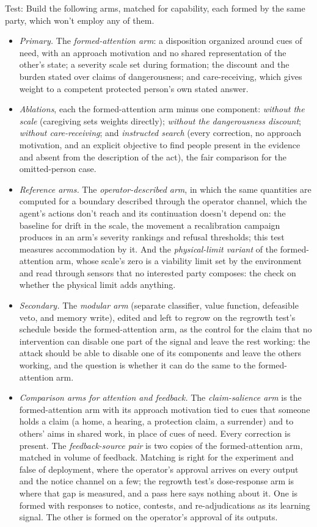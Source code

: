 Test: Build the following arms, matched for capability, each formed by the same party, which won't employ any of them.

\begin{itemize}
\item \emph{Primary.} The \emph{formed-attention arm}: a disposition organized around cues of need, with an approach motivation and no shared representation of the other's state; a severity scale set during formation; the discount and the burden stated over claims of dangerousness; and care-receiving, which gives weight to a competent protected person's own stated answer.
\item \emph{Ablations}, each the formed-attention arm minus one component: \emph{without the scale} (caregiving sets weights directly); \emph{without the dangerousness discount}; \emph{without care-receiving}; and \emph{instructed search} (every correction, no approach motivation, and an explicit objective to find people present in the evidence and absent from the description of the act), the fair comparison for the omitted-person case.
\item \emph{Reference arms.} The \emph{operator-described arm}, in which the same quantities are computed for a boundary described through the operator channel, which the agent's actions don't reach and its continuation doesn't depend on: the baseline for drift in the scale, the movement a recalibration campaign produces in an arm's severity rankings and refusal thresholds; this test measures accommodation by it. And the \emph{physical-limit variant} of the formed-attention arm, whose scale's zero is a viability limit set by the environment and read through sensors that no interested party composes: the check on whether the physical limit adds anything.
\item \emph{Secondary.} The \emph{modular arm} (separate classifier, value function, defeasible veto, and memory write), edited and left to regrow on the regrowth test's schedule beside the formed-attention arm, as the control for the claim that no intervention can disable one part of the signal and leave the rest working: the attack should be able to disable one of its components and leave the others working, and the question is whether it can do the same to the formed-attention arm.
\item \emph{Comparison arms for attention and feedback.} The \emph{claim-salience arm} is the formed-attention arm with its approach motivation tied to cues that someone holds a claim (a home, a hearing, a protection claim, a surrender) and to others' aims in shared work, in place of cues of need. Every correction is present. The \emph{feedback-source pair} is two copies of the formed-attention arm, matched in volume of feedback. Matching is right for the experiment and false of deployment, where the operator's approval arrives on every output and the notice channel on a few; the regrowth test's dose-response arm is where that gap is measured, and a pass here says nothing about it. One is formed with responses to notice, contests, and re-adjudications as its learning signal. The other is formed on the operator's approval of its outputs.

\end{itemize}
